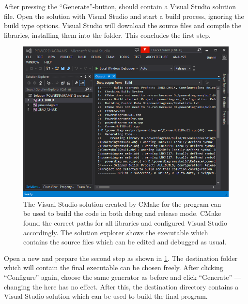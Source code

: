 After pressing the \enquote{Generate}-button,  should contain a Visual Studio solution file.
Open the solution with Visual Studio and start a build process, ignoring the build type options.
Visual Studio will download the source files and compile the libraries, installing them into the  folder.
This concludes the first step.

\begin{figure}[tb]
    \centering
    \includegraphics[width=0.9\linewidth]{cmake_5.png}
    \caption{The Visual Studio solution created by CMake for the program can be used to build the code in both debug and release mode.
    CMake found the correct paths for all libraries and configured Visual Studio accordingly.
    The solution explorer shows the  executable which contains the source files which can be edited and debugged as usual.}
    \label{fig:cmake_4}
\end{figure}
Open a new  and prepare the second step as shown in \cref{fig:cmake_4}.
The destination folder which will contain the final executable can be chosen freely.
After clicking \enquote{Configure} again, choose the same generator as before and click \enquote{Generate} --- changing the  here has no effect.
After this, the destination directory contains a Visual Studio solution which can be used to build the final program.

